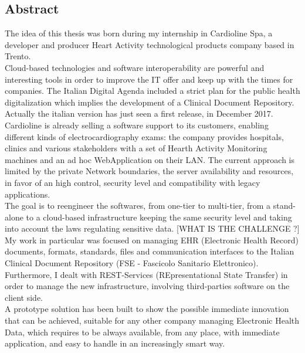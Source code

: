 \thispagestyle{empty}
\begin{center}
    {\chapter*{Abstract}} %
\end{center}
\label{abstract}

The idea of this thesis was born during my internship in Cardioline Spa, a developer and producer Heart Activity technological products company based in Trento.\\Cloud-based technologies and software interoperability are powerful and interesting tools in order to improve the IT offer and keep up with the times for companies. The Italian Digital Agenda included a strict plan for the public health digitalization which implies the development of a Clinical Document Repository. Actually the italian version has just seen a first release, in December 2017.\\Cardioline is already selling a software support to its customers, enabling different kinds of electrocardiography exams: the company provides hospitals, clinics and various stakeholders with a set of Hearth Activity Monitoring machines and an ad hoc WebApplication on their LAN. The current approach is limited by the private Network boundaries, the server availability and resources, in favor of an high control, security level and compatibility with legacy applications.\\The goal is to reengineer the softwares, from one-tier to multi-tier, from a stand-alone to a cloud-based infrastructure keeping the same security level and taking into account the laws regulating sensitive data. [WHAT IS THE CHALLENGE ?]\\My work in particular was focused on managing EHR (Electronic Health Record) documents, formats, standards, files and communication interfaces to the Italian Clinical Document Repository (FSE - Fascicolo Sanitario Elettronico).\\Furthermore, I dealt with REST-Services (REpresentational State Transfer) in order to manage the new infrastructure, involving third-parties software on the client side.\\A prototype solution has been built to show the possible immediate innovation that can be achieved, suitable for any other company managing Electronic Health Data, which requires to be always available, from any place, with immediate application, and easy to handle in an increasingly smart way.